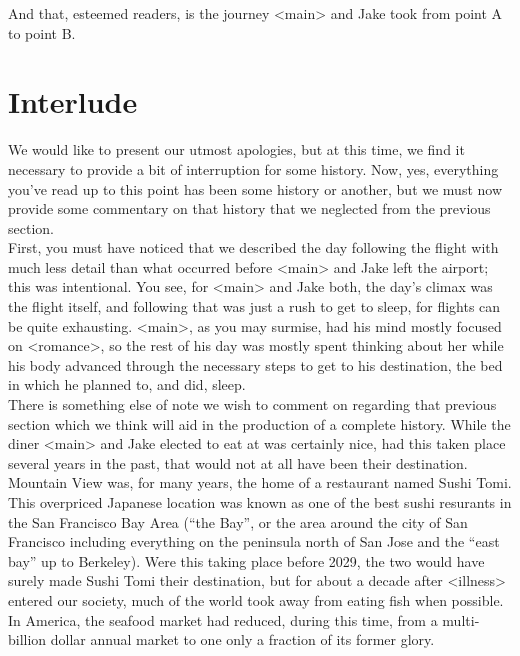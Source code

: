\documentclass[12pt,openany]{memoir}
\begin{document}
And that, esteemed readers, is the journey <main> and Jake took from point A to point B.

\chapter*{Interlude}

We would like to present our utmost apologies, but at this time, we find it necessary to provide a bit of interruption for some history.
Now, yes, everything you've read up to this point has been some history or another, but we must now provide some commentary on that history that we neglected from the previous section.
\\

First, you must have noticed that we described the day following the flight with much less detail than what occurred before <main> and Jake left the airport; this was intentional.
You see, for <main> and Jake both, the day's climax was the flight itself, and following that was just a rush to get to sleep, for flights can be quite exhausting.
<main>, as you may surmise, had his mind mostly focused on <romance>, so the rest of his day was mostly spent thinking about her while his body advanced through the necessary steps to get to his destination, the bed in which he planned to, and did, sleep.
\\

There is something else of note we wish to comment on regarding that previous section which we think will aid in the production of a complete history.
While the diner <main> and Jake elected to eat at was certainly nice, had this taken place several years in the past, that would not at all have been their destination.
Mountain View was, for many years, the home of a restaurant named Sushi Tomi.
This overpriced Japanese location was known as one of the best sushi resurants in the San Francisco Bay Area (``the Bay'', or the area around the city of San Francisco including everything on the peninsula north of San Jose and the ``east bay'' up to Berkeley).
Were this taking place before 2029, the two would have surely made Sushi Tomi their destination, but for about a decade after <illness> entered our society, much of the world took away from eating fish when possible.
In America, the seafood market had reduced, during this time, from a multi-billion dollar annual market to one only a fraction of its former glory.
\\
\end{document}
